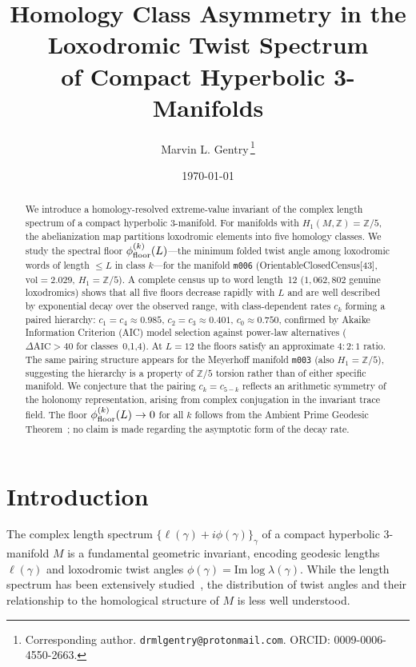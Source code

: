 \documentclass[12pt,a4paper]{article}
\newcommand{\mfld}[1]{\texttt{#1}}
\begin{document}
\title{Homology Class Asymmetry in the Loxodromic Twist Spectrum\\
of Compact Hyperbolic 3-Manifolds}

\author[1]{Marvin L. Gentry\,\thanks{Corresponding author. \texttt{drmlgentry@protonmail.com}. ORCID: 0009-0006-4550-2663.}}
\date{\today}
\maketitle

\begin{abstract}
We introduce a homology-resolved extreme-value invariant of the complex length
spectrum of a compact hyperbolic 3-manifold.
For manifolds with $H_1(M,\mathbb{Z})=\mathbb{Z}/5$, the abelianization map
partitions loxodromic elements into five homology classes.
We study the spectral floor $\phi_{\rm floor}^{(k)}(L)$---the minimum folded
twist angle among loxodromic words of length $\leq L$ in class $k$---for the
manifold \mfld{m006} (OrientableClosedCensus[43], $\mathrm{vol}=2.029$,
$H_1=\mathbb{Z}/5$).
A complete census up to word length~12 ($1{,}062{,}802$ genuine loxodromics)
shows that all five floors decrease rapidly with $L$ and are well described by
exponential decay over the observed range, with class-dependent rates
$c_k$ forming a paired hierarchy:
$c_1=c_4\approx 0.985$, $c_2=c_3\approx 0.401$, $c_0\approx 0.750$,
confirmed by Akaike Information Criterion (AIC) model selection against
power-law alternatives ($\Delta\mathrm{AIC}>40$ for classes~0,1,4).
At $L=12$ the floors satisfy an approximate $4:2:1$ ratio.
The same pairing structure appears for the Meyerhoff manifold \mfld{m003}
(also $H_1=\mathbb{Z}/5$), suggesting the hierarchy is a property of
$\mathbb{Z}/5$ torsion rather than of either specific manifold.
We conjecture that the pairing $c_k=c_{5-k}$ reflects an arithmetic symmetry
of the holonomy representation, arising from complex conjugation in the
invariant trace field.
The floor $\phi_{\rm floor}^{(k)}(L)\to 0$ for all $k$ follows from the
Ambient Prime Geodesic Theorem~\cite{BalogBiggs23}; no claim is made
regarding the asymptotic form of the decay rate.
\end{abstract}

\section{Introduction}
\label{sec:intro}

The complex length spectrum $\{\ell(\gamma)+i\phi(\gamma)\}_\gamma$ of a
compact hyperbolic 3-manifold $M$ is a fundamental geometric invariant,
encoding geodesic lengths $\ell(\gamma)$ and loxodromic twist angles
$\phi(\gamma)=\mathrm{Im}\log\lambda(\gamma)$.
While the length spectrum has been extensively studied~\cite{MaclachlanReid},
the distribution of twist angles and their relationship to the homological
structure of $M$ is less well understood.
\end{document}
